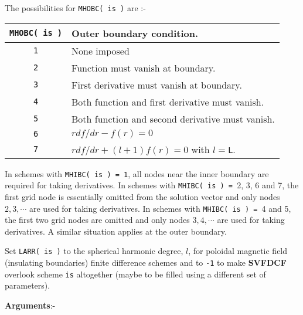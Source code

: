 The possibilities for \verb+MHOBC( is )+ are :- \newline

\begin{tabular}{|c|l|}
\hline
\verb+MHOBC( is )+ & Outer boundary condition. \\
\hline
\hline
\verb+1+ & None imposed \\
\hline
\verb+2+ & Function must vanish at boundary. \\
\hline
\verb+3+ & First derivative must vanish at boundary. \\
\hline
\verb+4+ & Both function and first derivative must vanish. \\
\hline
\verb+5+ & Both function and second derivative must vanish. \\
\hline
\verb+6+ & $rdf/dr - f(r) = 0$ \\
\hline
\verb+7+ & $r df/dr + (l+1) f(r) = 0$ with $l=$\verb+L+. \\
\hline
\end{tabular} \newline

In schemes with \verb+MHIBC( is ) = 1+, all nodes near
the inner boundary are required for taking derivatives.
In schemes with \verb+MHIBC( is ) = +2, 3, 6 and 7,
the first grid node is essentially omitted from the
solution vector and only nodes $2, 3, \cdots$ are
used for taking derivatives.
In schemes with \verb+MHIBC( is ) = +4 and 5,
the first two grid nodes are omitted and only nodes $3, 4, \cdots$ are
used for taking derivatives.
A similar situation applies at the outer boundary.

Set \verb+LARR( is )+ to the spherical harmonic degree, $l$,
for poloidal magnetic field (insulating boundaries) finite
difference schemes and to \verb+-1+ to make {\bf SVFDCF}
overlook scheme \verb+is+ altogether (maybe to be filled
using a different set of parameters).

{\bf Arguments}:- \newline

